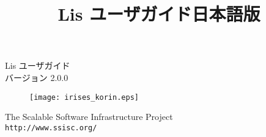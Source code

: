 \documentclass[a4paper]{jarticle}
\title{Lis ユーザガイド日本語版}
\author{}
\date{}
\begin{document}
\vspace*{4cm}
\begin{flushleft}
{\Large Lis ユーザガイド}\\
バージョン 2.0.0
\end{flushleft}

\vspace*{2cm}
\begin{figure}[h]
\texttt{[image: irises\_korin.eps]}
\end{figure}

\vspace*{2cm}
\begin{flushleft}
{\large The Scalable Software Infrastructure
Project\\
{\tt http://www.ssisc.org/}}\\
\end{flushleft}

\vspace*{5mm}
\thispagestyle{empty}
\end{document}
